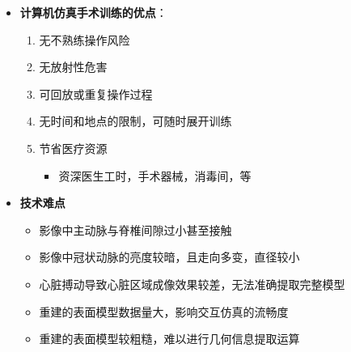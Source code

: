 \begin{frame}
\begin{itemize}
  \item \textbf{计算机仿真手术训练的优点}：
  \begin{enumerate}
     \item 无不熟练操作风险
     \item 无放射性危害
     \item 可回放或重复操作过程
     \item 无时间和地点的限制，可随时展开训练
     \item 节省医疗资源
	\begin{itemize}
	\item 资深医生工时，手术器械，消毒间，等
	\end{itemize}
  \end{enumerate}
\end{itemize}
\end{frame}

\begin{frame}
\begin{itemize}
\item \textbf{技术难点}
\begin{itemize}
\pause \item 影像中主动脉与脊椎间隙过小甚至接触
\pause \item 影像中冠状动脉的亮度较暗，且走向多变，直径较小
\pause \item 心脏搏动导致心脏区域成像效果较差，无法准确提取完整模型
\pause \item 重建的表面模型数据量大，影响交互仿真的流畅度
\pause \item 重建的表面模型较粗糙，难以进行几何信息提取运算
\end{itemize}
\end{itemize}
\end{frame}

